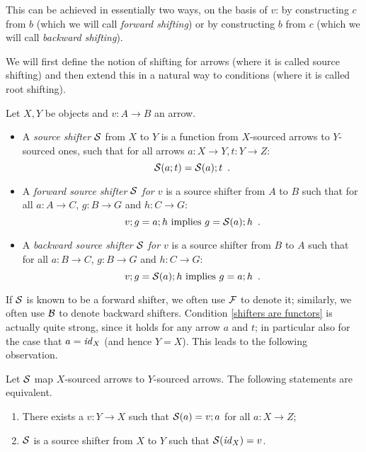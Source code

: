 This can be achieved in essentially two ways, on the basis of $v$: by constructing $c$ from $b$ (which we will call \emph{forward shifting}) or by constructing $b$ from $c$ (which we will call \emph{backward shifting}).

We will first define the notion of shifting for arrows (where it is called source shifting) and then extend this in a natural way to conditions (where it is called root shifting).

\begin{definition}
Let $X,Y$ be objects and $v:A\to B$ an arrow.
\begin{itemize}[topsep=\smallskipamount]
\item A \emph{source shifter} $\mathcal{S}$ from $X$ to $Y$ is a function from $X$-sourced arrows to $Y$-sourced ones, such that for all arrows $a:X\to Y, t:Y\to Z$:
%
\begin{equation}\eqlabel{shifters are functors}
\cS(a;t) = \cS(a);t \enspace.
\end{equation}
%
\item A \emph{forward source shifter $\mathcal{S}$ for $v$} is a source shifter from $A$ to $B$ such that for all $a:A\to C$, $g:B\to G$ and $h:C\to G$:
%
\begin{equation}\eqlabel{forward condition}
v;g = a;h \text{ implies } g = \cS(a);h \enspace.
\end{equation}
%
\item A \emph{backward source shifter $\mathcal{S}$ for $v$} is a source shifter from $B$ to $A$ such that for all $a:B\to C$, $g:B\to G$ and $h:C\to G$:
%
\begin{equation}\eqlabel{backward condition}
v;g = \cS(a);h \text{ implies } g = a;h \enspace.
\end{equation}
\end{itemize}
\end{definition}
%
If $\mathcal{S}$ is known to be a forward shifter, we often use $\mathcal{F}$ to denote it; similarly, we often use $\mathcal{B}$ to denote backward shifters. Condition \eqref{shifters are functors} is actually quite strong, since it holds for any arrow $a$ and $t$; in particular also for the case that $a=\mathit{id}_X$ (and hence $Y=X$). This leads to the following observation.
%
\begin{lemma}
Let $\mathcal{S}$ map $X$-sourced arrows to $Y$-sourced arrows. The following statements are equivalent.
\begin{enumerate}[topsep=\smallskipamount,label=(\alph*),ref=(\alph{enumi})]
\item\label{shifter-1} There exists a $v:Y\to X$ such that $\mathcal{S}(a)=v;a$ for all $a:X\to Z$;
\item\label{shifter-2} $\mathcal{S}$ is a source shifter from $X$ to $Y$ such that $\mathcal{S}(\mathit{id}_X)=v$.
\end{enumerate}
\end{lemma}
